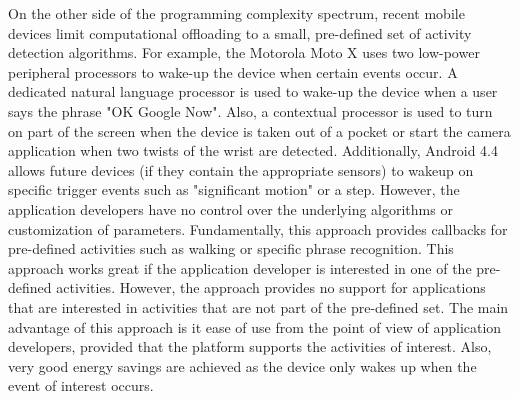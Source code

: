 On the other side of the programming complexity spectrum, recent mobile devices limit computational offloading to a small, pre-defined set of activity detection algorithms. For example, the Motorola Moto X uses two low-power peripheral processors to wake-up the device when certain events occur. A dedicated natural language processor is used to wake-up the device when a user says the phrase "OK Google Now". Also, a contextual processor is used to turn on part of the screen when the device is taken out of a pocket or start the camera application when two twists of the wrist are detected. Additionally, Android 4.4 allows future devices (if they contain the appropriate sensors) to wakeup on specific trigger events such as "significant motion" or a step. However, the application developers have no control over the underlying algorithms or customization of parameters. Fundamentally, this approach provides callbacks for pre-defined activities such as walking or specific phrase recognition. This approach works great if the application developer is interested in one of the pre-defined activities. However, the approach provides no support for applications that are interested in activities that are not part of the pre-defined set. The main advantage of this approach is it ease of use from the point of view of application developers, provided that the platform supports the activities of interest. Also, very good energy savings are achieved as the device only wakes up when the event of interest occurs.
